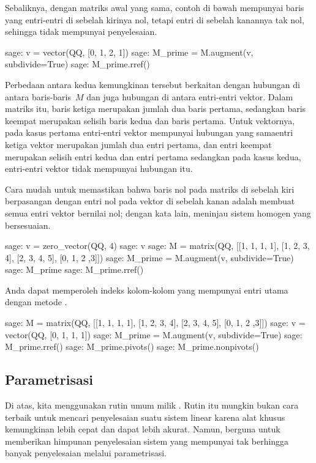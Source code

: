 Sebaliknya, dengan matriks awal yang sama,
contoh di bawah mempunyai baris yang entri-entri di sebelah kirinya nol,
tetapi entri di sebelah kanannya tak nol, sehingga tidak mempunyai penyelesaian.
\begin{sagecommandline} 
sage: v = vector(QQ, [0, 1, 2, 1])             
sage: M_prime = M.augment(v, subdivide=True)
sage: M_prime.rref()                        
\end{sagecommandline}

Perbedaan antara kedua kemungkinan tersebut
berkaitan dengan hubungan di antara
baris-baris~$M$ dan juga hubungan di antara entri-entri vektor.
Dalam matriks itu,
baris ketiga merupakan jumlah dua baris pertama, sedangkan baris keempat
merupakan selisih baris kedua dan baris pertama.
Untuk vektornya, pada kasus pertama entri-entri vektor mempunyai hubungan
yang sama\Dash entri ketiga vektor merupakan jumlah dua entri pertama,
dan entri keempat merupakan selisih entri kedua dan entri pertama\Dash
sedangkan pada kasus kedua, entri-entri vektor tidak mempunyai hubungan itu.

Cara mudah untuk memastikan bahwa baris nol pada matriks
di sebelah kiri berpasangan dengan entri nol
pada vektor di sebelah kanan adalah membuat semua entri vektor bernilai nol;
dengan kata lain, meninjau sistem homogen yang bersesuaian.
\begin{sagecommandline}
sage: v = zero_vector(QQ, 4)
sage: v
sage: M = matrix(QQ, [[1, 1, 1, 1], [1, 2, 3, 4], [2, 3, 4, 5], [0, 1, 2 ,3]]) 
sage: M_prime = M.augment(v, subdivide=True)
sage: M_prime
sage: M_prime.rref()
\end{sagecommandline}

Anda dapat memperoleh indeks kolom-kolom yang mempunyai entri utama dengan
metode .
\begin{sagecommandline}
sage: M = matrix(QQ, [[1, 1, 1, 1], [1, 2, 3, 4], [2, 3, 4, 5], [0, 1, 2 ,3]]) 
sage: v = vector(QQ, [0, 1, 1, 1])
sage: M_prime = M.augment(v, subdivide=True)
sage: M_prime.rref()
sage: M_prime.pivots()         
sage: M_prime.nonpivots()         
\end{sagecommandline}





\subsection{Parametrisasi}
Di atas, kita menggunakan rutin umum  milik \Sage{}.
Rutin itu mungkin bukan cara terbaik untuk mencari penyelesaian
suatu sistem linear karena alat khusus kemungkinan lebih cepat dan
dapat lebih akurat. 
Namun,  berguna untuk memberikan himpunan penyelesaian
sistem yang mempunyai tak berhingga banyak penyelesaian melalui parametrisasi.

